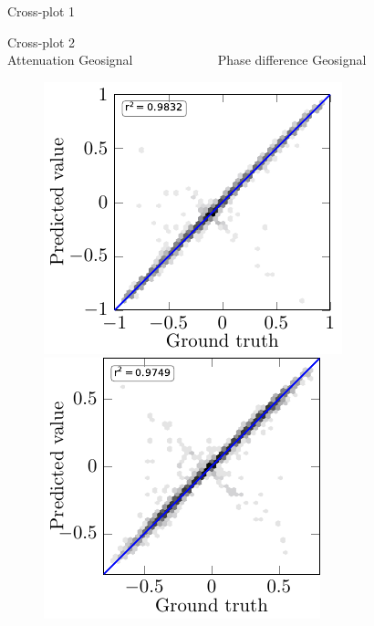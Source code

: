 \begin{frame}{Cross-plot 1}
\begin{figure}[!h]
\end{figure}
\end{frame}
\begin{frame}{Cross-plot 2}
\centering
\setlength{\fboxrule}{0.5mm}
\setlength{\fboxsep}{1mm}
\color{red}
\color{black}
$\qquad$ \\
\hspace{0.8cm} Attenuation Geosignal $\qquad \qquad \qquad$ Phase difference Geosignal
\begin{figure}[!h]
\centering
	{%
		\includegraphics[scale=0.9]{Diapos/DL_For_Inv/Figures/Syn_example/Cross_plots/Two_Step_loss/C_P_2/atten_geo.pdf}
		\hspace{2cm}
		\includegraphics[trim=0cm 0cm 0.3cm 0.25cm, scale=0.9]{Diapos/DL_For_Inv/Figures/Syn_example/Cross_plots/Two_Step_loss/C_P_2/phase_geo.pdf}}
\end{figure}	
\end{frame}
